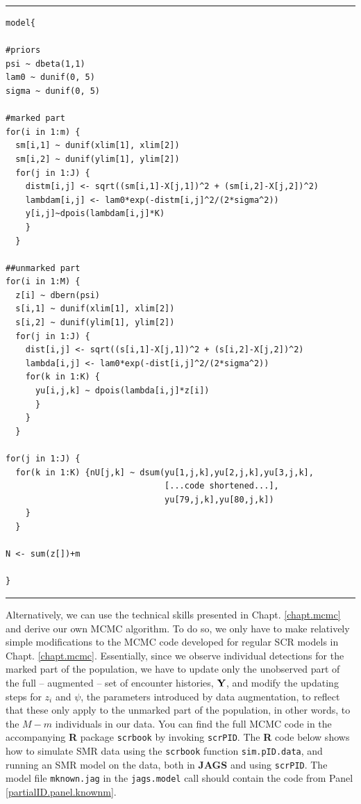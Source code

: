 \begin{panel}[htp]
\centering
\rule[0.15in]{\textwidth}{.03in}
{\small
\begin{verbatim}
model{

#priors
psi ~ dbeta(1,1)
lam0 ~ dunif(0, 5)
sigma ~ dunif(0, 5)

#marked part
for(i in 1:m) {
  sm[i,1] ~ dunif(xlim[1], xlim[2])
  sm[i,2] ~ dunif(ylim[1], ylim[2])
  for(j in 1:J) {
    distm[i,j] <- sqrt((sm[i,1]-X[j,1])^2 + (sm[i,2]-X[j,2])^2)
    lambdam[i,j] <- lam0*exp(-distm[i,j]^2/(2*sigma^2))
    y[i,j]~dpois(lambdam[i,j]*K)
    }
  }

##unmarked part
for(i in 1:M) {
  z[i] ~ dbern(psi)
  s[i,1] ~ dunif(xlim[1], xlim[2])
  s[i,2] ~ dunif(ylim[1], ylim[2])
  for(j in 1:J) {
    dist[i,j] <- sqrt((s[i,1]-X[j,1])^2 + (s[i,2]-X[j,2])^2)
    lambda[i,j] <- lam0*exp(-dist[i,j]^2/(2*sigma^2))
    for(k in 1:K) {
      yu[i,j,k] ~ dpois(lambda[i,j]*z[i])
      }
    }
  }

for(j in 1:J) {
  for(k in 1:K) {nU[j,k] ~ dsum(yu[1,j,k],yu[2,j,k],yu[3,j,k],
								[...code shortened...],
								yu[79,j,k],yu[80,j,k])
	}
  }

N <- sum(z[])+m

}
\end{verbatim}
}
\rule[-0.15in]{\textwidth}{.03in}
\caption{
{\bf JAGS} code for SMR model with known number of marked
individuals. In this example, $M$, the size of the augmented unmarked
data set, is 80. Note that the arguments yu[4,j,k] to yu[78,j,k] of
the {\tt dsum()} function are omitted from the code to conserve
space. %
}
\label{partialID.panel.knownm}
\end{panel}

Alternatively, we can use the technical skills presented in Chapt. \ref{chapt.mcmc} and derive our own MCMC algorithm. To do so, we only have to make relatively
simple modifications to the MCMC code developed for regular SCR models in
Chapt. \ref{chapt.mcmc}.
Essentially, since we observe individual detections for the marked part of the population, we have to update only the unobserved part of the full -- augmented -- set of encounter histories, ${\bf Y}$, and
modify the updating steps for $z_i$ and $\psi$, the parameters introduced by data augmentation, to reflect that these only apply to the unmarked part of the population, in other words, to the $M-m$ individuals in our data. You can find the full MCMC code in the accompanying {\bf R} package {\tt scrbook} by invoking {\tt scrPID}. The {\bf R} code below shows how to simulate SMR data using the {\tt scrbook} function {\tt sim.pID.data}, and running an SMR model on the data, both in {\bf JAGS} and using {\tt scrPID}. The model file {\tt mknown.jag} in the {\tt jags.model} call should contain the code from Panel \ref{partialID.panel.knownm}.

